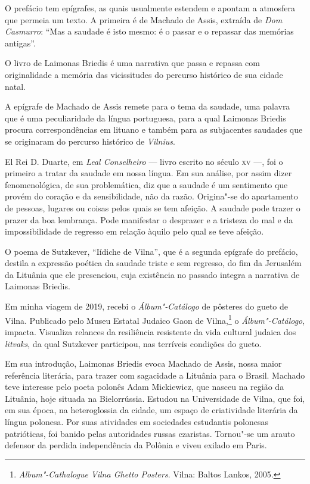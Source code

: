 O prefácio tem epígrafes, as quais usualmente estendem e apontam a
atmosfera que permeia um texto. A primeira é de Machado de Assis,
extraída de \textit{Dom Casmurro}: ``Mas a saudade é isto mesmo: é o
passar e o repassar das memórias antigas''.

O livro de Laimonas Briedis é uma narrativa que passa e repassa com
originalidade a memória das vicissitudes do percurso histórico de sua
cidade natal.

A epígrafe de Machado de Assis remete para o tema da saudade, uma
palavra que é uma peculiaridade da língua portuguesa, para a qual
Laimonas Briedis procura correspondências em lituano e também para as
subjacentes saudades que se originaram do percurso histórico de \textit{Vilnius}.

El Rei D. Duarte, em \textit{Leal Conselheiro} --- livro escrito no século \textsc{xv} ---, 
foi o primeiro a tratar da saudade em nossa língua. Em sua análise, por assim dizer
fenomenológica, de sua problemática, diz que a saudade é um sentimento
que provém do coração e da sensibilidade, não da razão. Origina"-se do
apartamento de pessoas, lugares ou coisas pelos quais se tem afeição. A
saudade pode trazer o prazer da boa lembrança. Pode manifestar o
desprazer e a tristeza do mal e da impossibilidade de regresso em
relação àquilo pelo qual se teve afeição.

O poema de Sutzkever, ``Iídiche de Vilna'', que é a segunda epígrafe do
prefácio, destila a expressão poética da saudade triste e sem regresso,
do fim da Jerusalém da Lituânia que ele presenciou, cuja existência no
passado integra a narrativa de Laimonas Briedis.

Em minha viagem de 2019, recebi o \textit{Álbum"-Catálogo} de
pôsteres do gueto de Vilna. Publicado pelo Museu Estatal Judaico Gaon de
Vilna,\footnote{\textit{Album"-Cathalogue Vilna Ghetto Posters}. Vilna: Baltos Lankos, 2005.} o 
\textit{Álbum"-Catálogo}, impacta. Visualiza relances da resiliência
resistente da vida cultural judaica dos \textit{litvaks}, da qual
Sutzkever participou, nas terríveis condições do gueto.

Em sua introdução, Laimonas Briedis evoca Machado de Assis, nossa
maior referência literária, para trazer com sagacidade a Lituânia para
o Brasil. Machado teve interesse pelo poeta polonês Adam Mickiewicz, que
nasceu na região da Lituânia, hoje situada na Bielorrússia. Estudou na
Universidade de Vilna, que foi, em sua época, na heteroglossia da
cidade, um espaço de criatividade literária da língua polonesa. Por suas
atividades em sociedades estudantis polonesas patrióticas, foi banido
pelas autoridades russas czaristas. Tornou"-se um arauto defensor da
perdida independência da Polônia e viveu exilado em Paris.

